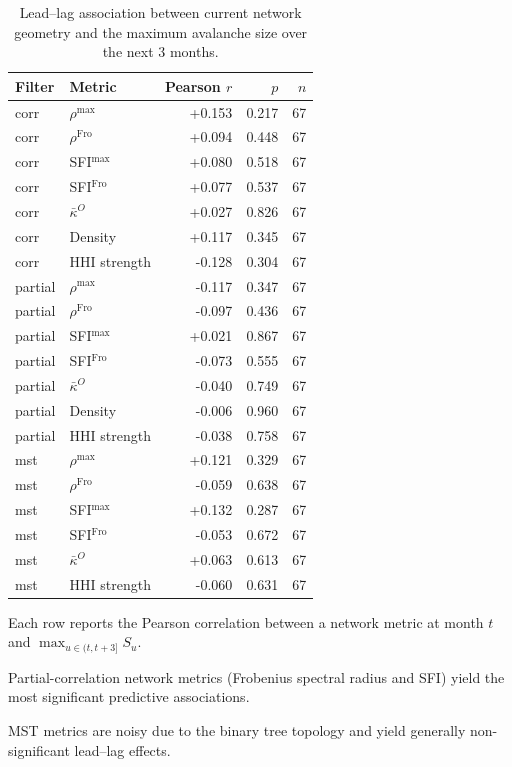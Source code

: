 \begin{table}[!htbp]
\centering
\footnotesize
\begin{threeparttable}
\caption{Lead--lag association between current network geometry and the maximum avalanche size over the next 3 months.}
\label{tab:network_predictive}
\begin{tabular}{llrrr}
\toprule
Filter & Metric & Pearson $r$ & $p$ & $n$ \\
\midrule
corr & $\rho^{\max}$ & +0.153 & 0.217 & 67 \\
corr & $\rho^{\mathrm{Fro}}$ & +0.094 & 0.448 & 67 \\
corr & SFI$^{\max}$ & +0.080 & 0.518 & 67 \\
corr & SFI$^{\mathrm{Fro}}$ & +0.077 & 0.537 & 67 \\
corr & $\bar{\kappa}^O$ & +0.027 & 0.826 & 67 \\
corr & Density & +0.117 & 0.345 & 67 \\
corr & HHI strength & -0.128 & 0.304 & 67 \\
partial & $\rho^{\max}$ & -0.117 & 0.347 & 67 \\
partial & $\rho^{\mathrm{Fro}}$ & -0.097 & 0.436 & 67 \\
partial & SFI$^{\max}$ & +0.021 & 0.867 & 67 \\
partial & SFI$^{\mathrm{Fro}}$ & -0.073 & 0.555 & 67 \\
partial & $\bar{\kappa}^O$ & -0.040 & 0.749 & 67 \\
partial & Density & -0.006 & 0.960 & 67 \\
partial & HHI strength & -0.038 & 0.758 & 67 \\
mst & $\rho^{\max}$ & +0.121 & 0.329 & 67 \\
mst & $\rho^{\mathrm{Fro}}$ & -0.059 & 0.638 & 67 \\
mst & SFI$^{\max}$ & +0.132 & 0.287 & 67 \\
mst & SFI$^{\mathrm{Fro}}$ & -0.053 & 0.672 & 67 \\
mst & $\bar{\kappa}^O$ & +0.063 & 0.613 & 67 \\
mst & HHI strength & -0.060 & 0.631 & 67 \\
\bottomrule
\end{tabular}
\begin{tablenotes}\footnotesize
\item Each row reports the Pearson correlation between a network metric at month $t$ and $\max_{u\in(t,t+3]} S_u$.
\item Partial-correlation network metrics (Frobenius spectral radius and SFI) yield the most significant predictive associations.
\item MST metrics are noisy due to the binary tree topology and yield generally non-significant lead--lag effects.
\end{tablenotes}
\end{threeparttable}
\end{table}
